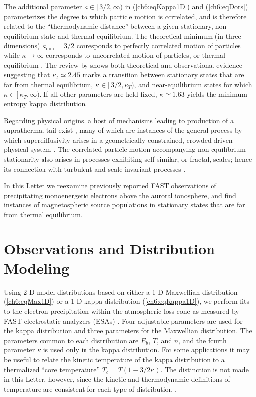  The additional parameter $\kappa \in [ \, 3/2, \infty )$ in
 (\ref{ch6:eqKappa1D}) and (\ref{ch6:eqDors}) parameterizes the degree
 to which particle motion is correlated, and is therefore related to
 the ``thermodynamic distance'' between a given stationary,
 non-equilibrium state and thermal equilibrium. The theoretical
 minimum (in three dimensions) $\kappa_{\textrm{min}} = 3/2$
 corresponds to perfectly correlated motion of particles while $\kappa
 \rightarrow \infty$ corresponds to uncorrelated motion of particles,
 or thermal equilibrium
 \citep{Livadiotis2010,Livadiotis2011,Livadiotis2013}. The review by
 \citet{Livadiotis2010} shows both theoretical and observational
 evidence suggesting that $\kappa_t \simeq 2.45$ marks a transition
 between stationary states that are far from thermal equilibrium,
 $\kappa \in [ \, 3/2, \kappa_T )$, and near-equilibrium states for
 which $\kappa \in [ \, \kappa_T, \infty )$. If all other parameters
 are held fixed, $\kappa \simeq 1.63$ yields the minimum-entropy kappa
 distribution.

 Regarding physical origins, a host of mechanisms leading to
 production of a suprathermal tail exist \citep[e.g., review
 by][]{Pierrard2010}, many of which are instances of the general
 process by which superdiffusivity arises in a geometrically
 constrained, crowded driven physical system \citep{Benichou2013}.
 The correlated particle motion accompanying non-equilibrium
 stationarity also arises in processes exhibiting self-similar, or
 fractal, scales; hence its connection with turbulent and
 scale-invariant processes \citep{West1990,Treumann1999a,Leubner2004}.

 In this Letter we reexamine previously reported FAST observations of
 precipitating monoenergetic electrons above the auroral ionosphere,
 and find instances of magnetospheric source populations in stationary
 states that are far from thermal equilibrium.

  \section{Observations and Distribution Modeling}

  Using 2-D model distributions based on either a 1-D Maxwellian
  distribution (\ref{ch6:eqMax1D}) or a 1-D kappa distribution
  (\ref{ch6:eqKappa1D}), we perform fits to the electron precipitation
  within the atmospheric loss cone as measured by FAST electrostatic
  analyzers (ESAs) \citep{Carlson2001}. Four adjustable parameters are
  used for the kappa distribution and three parameters for the
  Maxwellian distribution. The parameters common to each distribution
  are $E_b$, $T$, and $n$, and the fourth parameter $\kappa$ is used
  only in the kappa distribution. For some applications
  \citep[e.g.,][]{Sutherland2012} it may be useful to relate the
  kinetic temperature of the kappa distribution to a thermalized
  ``core temperature'' $T_c = T (1-3/2 \kappa)$. The distinction is
  not made in this Letter, however, since the kinetic and
  thermodynamic definitions of temperature are consistent for each
  type of distribution \citep{Livadiotis2010}.

